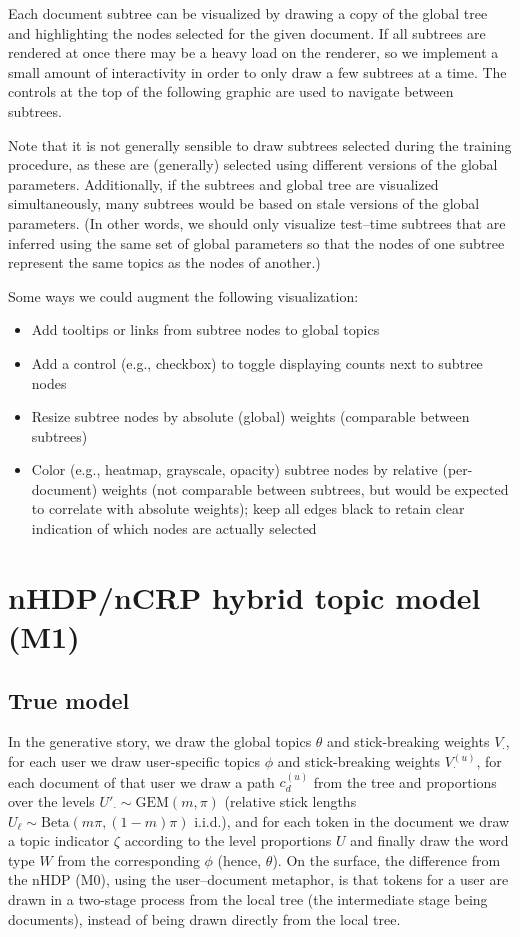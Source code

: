 \documentclass{article}
\newcommand{\Beta}{\ensuremath{\mathrm{Beta}}}
\newcommand{\GEM}{\ensuremath{\mathrm{GEM}}}
\begin{document}
Each document subtree can be visualized by drawing a copy of the global tree and highlighting the nodes selected for the given document.  If all subtrees are rendered at once there may be a heavy load on the renderer, so we implement a small amount of interactivity in order to only draw a few subtrees at a time.  The controls at the top of the following graphic are used to navigate between subtrees.

Note that it is not generally sensible to draw subtrees selected during the training procedure, as these are (generally) selected using different versions of the global parameters.  Additionally, if the subtrees and global tree are visualized simultaneously, many subtrees would be based on stale versions of the global parameters.  (In other words, we should only visualize test--time subtrees that are inferred using the same set of global parameters so that the nodes of one subtree represent the same topics as the nodes of another.)

Some ways we could augment the following visualization:
\begin{itemize}
\item Add tooltips or links from subtree nodes to global topics
\item Add a control (e.g., checkbox) to toggle displaying counts next to subtree nodes
\item Resize subtree nodes by absolute (global) weights (comparable between subtrees)
\item Color (e.g., heatmap, grayscale, opacity) subtree nodes by relative (per-document) weights (not comparable between subtrees, but would be expected to correlate with absolute weights); keep all edges black to retain clear indication of which nodes are actually selected
\end{itemize}






\section*{nHDP/nCRP hybrid topic model (M1)}

\subsection*{True model}

In the generative story, we draw the global topics $\theta$ and stick-breaking weights $V_{\cdot}$, for each user we draw user-specific topics $\phi$ and stick-breaking weights $V_{\cdot}^{(u)}$, for each document of that user we draw a path $c_d^{(u)}$ from the tree and proportions over the levels $U'_{\cdot} \sim \GEM(m, \pi)$ (relative stick lengths $U_{\ell} \sim \Beta(m \pi, (1 - m) \pi)$ i.i.d.), and for each token in the document we draw a topic indicator $\zeta$ according to the level proportions $U$ and finally draw the word type $W$ from the corresponding $\phi$ (hence, $\theta$).  On the surface, the difference from the nHDP (M0), using the user--document metaphor, is that tokens for a user are drawn in a two-stage process from the local tree (the intermediate stage being documents), instead of being drawn directly from the local tree.
\end{document}
